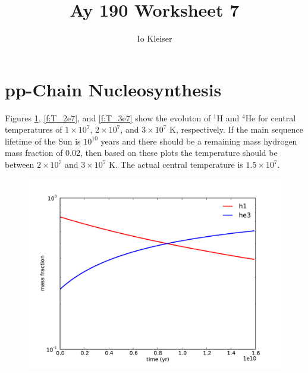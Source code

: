 \documentclass[12pt,preprint]{aastex}
\begin{document}

\title {Ay 190 Worksheet 7} 

\author{Io Kleiser}  

\section*{pp-Chain Nucleosynthesis}

Figures \ref{f:T_1e7}, \ref{f:T_2e7}, and \ref{f:T_3e7} show the evoluton of $^1$H and $^4$He for central temperatures of $1 \times 10^7$,  $2 \times 10^7$, and $3 \times 10^7$ K, respectively. If the main sequence lifetime of the Sun is $10^{10}$ years and there should be a remaining mass hydrogen mass fraction of 0.02, then based on these plots the temperature should be between $2 \times 10^7$ and $3 \times 10^7$ K. The actual central temperature is $1.5 \times 10^7$.

\begin{figure}[!ht]
\begin{center}
\includegraphics[width=5in]{T_1e7.pdf}
\end{center}
\caption{ \label{f:T_1e7}}
\end{figure}
\end{document}
